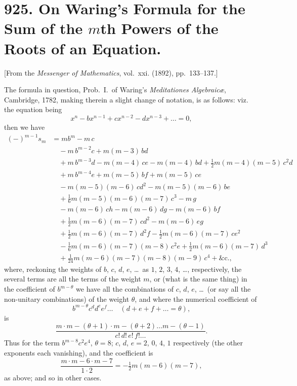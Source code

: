 \documentclass[11pt,a4paper]{book}
\begin{document}
{{{\newpage
\section*{925. On Waring's Formula for the Sum of the $m$th Powers of the Roots of an Equation.}

[From the \textit{Messenger of Mathematics}, vol.~xxi. (1892), pp.~133--137.]

\bigskip

The formula in question, Prob.~I.~of Waring's \textit{Meditationes Algebraic\ae}, Cambridge,
1782, making therein a slight change of notation, is as follows: viz. the equation being
\[
x^n - bx^{n-1} + cx^{n-2} - dx^{n-3} + \ldots = 0,
\]
then we have
\begin{align*}
(-)^{m-1} s_m &= mb^m - m\,c\\
&\quad - m\,b^{m-2}c + m(m-3)\,bd\\
&\quad + m\,b^{m-3}d - m(m-4)\,ce - m(m-4)\,bd + \tfrac{1}{2}m(m-4)(m-5)\,c^2d\\
&\quad + m\,b^{m-4}e + m(m-5)\,bf + m(m-5)\,ce\\
&\quad - m(m-5)(m-6)\,cd^2 - m(m-5)(m-6)\,be\\
&\quad + \tfrac{1}{6}m(m-5)(m-6)(m-7)\,c^3 - m\,g\\
&\quad - m(m-6)\,ch - m(m-6)\,dg - m(m-6)\,bf\\
&\quad + \tfrac{1}{2}m(m-6)(m-7)\,cd^2 - m(m-6)\,eg\\
&\quad + \tfrac{1}{2}m(m-6)(m-7)\,d^2f - \tfrac{1}{2}m(m-6)(m-7)\,ce^2\\
&\quad - \tfrac{1}{6}m(m-6)(m-7)(m-8)\,c^2e + \tfrac{1}{2}m(m-6)(m-7)\,d^3\\
&\quad + \tfrac{1}{24}m(m-6)(m-7)(m-8)(m-9)\,c^4 + \&\text{c.},
\end{align*}
where, reckoning the weights of $b$, $c$, $d$, $e$, \ldots\ as $1$, $2$, $3$, $4$, \ldots, respectively, the several
terms are all the terms of the weight $m$, or (what is the same thing) in the
coefficient of $b^{m-\theta}$ we have all the combinations of $c$, $d$, $e$, \ldots\ (or say all the
non-unitary combinations) of the weight $\theta$, and where the numerical coefficient of
\[
b^{m-\theta} c^d d^e e^f \ldots \quad (d + e + f + \ldots = \theta),
\]
is
\[
\frac{m \cdot m - (\theta + 1) \cdot m - (\theta + 2) \ldots m - (\theta - 1)}{c!\,d!\,e!\,f!\ldots}.
\]
Thus for the term $b^{m-8}c^2e^4$, $\theta = 8$; $c$, $d$, $e = 2$, $0$, $4$, $1$ respectively (the other exponents
each vanishing), and the coefficient is
\[
\frac{m \cdot m-6 \cdot m-7}{1 \cdot 2} = -\tfrac{1}{2}m(m-6)(m-7),
\]
as above; and so in other cases.

}}}
\end{document}
